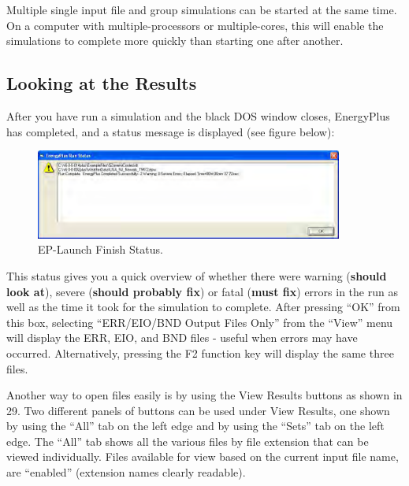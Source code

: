 Multiple single input file and group simulations can be started at the same time. On a computer with multiple-processors or multiple-cores, this will enable the simulations to complete more quickly than starting one after another.

\subsection{Looking at the Results}\label{looking-at-the-results}

After you have run a simulation and the black DOS window closes, EnergyPlus has completed, and a status message is displayed (see figure below):

\begin{figure}[hbtp] %
\centering
\includegraphics[width=0.9\textwidth, height=0.9\textheight, keepaspectratio=true]{media/image102.png}
\caption{EP-Launch Finish Status. \protect \label{fig:ep-launch-finish-status.}}
\end{figure}

This status gives you a quick overview of whether there were warning (\textbf{should look at}), severe (\textbf{should probably fix}) or fatal (\textbf{must fix}) errors in the run as well as the time it took for the simulation to complete. After pressing ``OK'' from this box, selecting ``ERR/EIO/BND Output Files Only'' from the ``View'' menu will display the ERR, EIO, and BND files - useful when errors may have occurred. Alternatively, pressing the F2 function key will display the same three files.

Another way to open files easily is by using the View Results buttons as shown in 29. Two different panels of buttons can be used under View Results, one shown by using the ``All'' tab on the left edge and by using the ``Sets'' tab on the left edge. The ``All'' tab shows all the various files by file extension that can be viewed individually. Files available for view based on the current input file name, are ``enabled'' (extension names clearly readable).

